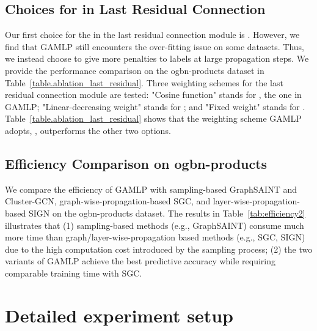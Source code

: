 \documentclass[sigconf]{acmart}
\begin{document}
\subsection{Choices for  in Last Residual Connection}
Our first choice for the  in the last residual connection module is . However, we find that GAMLP still encounters the over-fitting issue on some datasets. Thus, we instead choose  to give more penalties to labels at large propagation steps.
We provide the performance comparison on the ogbn-products dataset in Table~\ref{table.ablation_last_residual}. Three weighting schemes for the last residual connection module are tested: "Cosine function" stands for , the one in GAMLP; "Linear-decreasing weight" stands for ; and "Fixed weight" stands for . Table~\ref{table.ablation_last_residual} shows that the weighting scheme GAMLP adopts, , outperforms the other two options.


\subsection{Efficiency Comparison on ogbn-products}
We compare the efficiency of GAMLP with sampling-based GraphSAINT and Cluster-GCN, graph-wise-propagation-based SGC, and layer-wise-propagation-based SIGN on the ogbn-products dataset.
The results in Table~\ref{tab:efficiency2} illustrates that (1) sampling-based methods (e.g., GraphSAINT) consume much more time than graph/layer-wise-propagation based methods (e.g., SGC, SIGN) due to the high computation cost introduced by the sampling process;
(2) the two variants of GAMLP achieve the best predictive accuracy while requiring comparable training time with SGC.

\begin{table}[tpb!]
\caption{Ablation study of choices for  on ogbn-products.}
\centering
{
\noindent
\renewcommand{\multirowsetup}{\centering}
}
\label{table.ablation_last_residual}
\end{table}


\section{Detailed experiment setup}
\label{app:settings}
\end{document}
